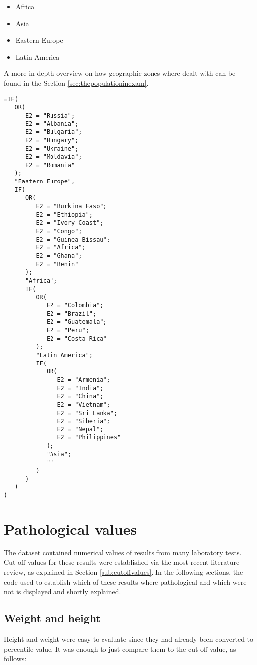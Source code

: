 \begin{itemize}
    \item Africa
    \item Asia
    \item Eastern Europe
    \item Latin America
\end{itemize}

A more in-depth overview on how geographic zones where dealt with can be found in the Section  \ref{sec:thepopulationinexam}.

\begin{lstlisting}
=IF(
   OR(
      E2 = "Russia";
      E2 = "Albania";
      E2 = "Bulgaria";
      E2 = "Hungary";
      E2 = "Ukraine";
      E2 = "Moldavia";
      E2 = "Romania"
   );
   "Eastern Europe";
   IF(
      OR(
         E2 = "Burkina Faso";
         E2 = "Ethiopia";
         E2 = "Ivory Coast";
         E2 = "Congo";
         E2 = "Guinea Bissau";
         E2 = "Africa";
         E2 = "Ghana";
         E2 = "Benin"
      );
      "Africa";
      IF(
         OR(
            E2 = "Colombia";
            E2 = "Brazil";
            E2 = "Guatemala";
            E2 = "Peru";
            E2 = "Costa Rica"
         );
         "Latin America";
         IF(
            OR(
               E2 = "Armenia";
               E2 = "India";
               E2 = "China";
               E2 = "Vietnam";
               E2 = "Sri Lanka";
               E2 = "Siberia";
               E2 = "Nepal";
               E2 = "Philippines"
            );
            "Asia";
            ""
         )
      )
   )
)
\end{lstlisting}

\section{Pathological values}\label{asec:pathologicalvalues}
The dataset contained numerical values of results from many laboratory tests. Cut-off values for these results were established via the most recent literature review, as explained in Section \ref{sub:cutoffvalues}. In the following sections, the code used to establish which of these results where pathological and which were not is displayed and shortly explained.

\subsection{Weight and height}\label{asub:patweightandheight}
Height and weight were easy to evaluate since they had already been converted to percentile value. It was enough to just compare them to the cut-off value, as follows:


